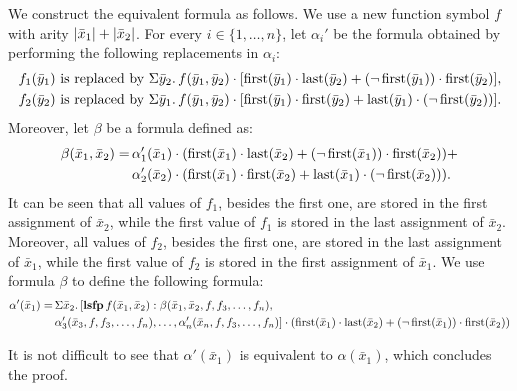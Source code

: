 We construct the equivalent formula as follows. We use a new function symbol $f$ with arity $\vert \bar{x}_1 \vert + \vert \bar{x}_2 \vert$. For every $i \in \{1,\ldots,n\}$, let $\alpha_i'$ be the formula obtained by performing the following replacements in $\alpha_i$:
\begin{align*}
f_1(\bar{y}_1) &\text{ is replaced by } \Sigma{\bar{y}_2}.\,f(\bar{y}_1,\bar{y}_2)\cdot[\operatorname{first}(\bar{y}_1)\cdot\operatorname{last}(\bar{y}_2)  + (\neg\operatorname{first}(\bar{y}_1))\cdot\operatorname{first}(\bar{y}_2)], \\
f_2(\bar{y}_2) &\text{ is replaced by } \Sigma{\bar{y}_1}.\,f(\bar{y}_1,\bar{y}_2)\cdot[\operatorname{first}(\bar{y}_1)\cdot\operatorname{first}(\bar{y}_2)  + \operatorname{last}(\bar{y}_1)\cdot(\neg\operatorname{first}(\bar{y}_2))].
\end{align*}
Moreover, let $\beta$ be a formula defined as:
\begin{align*}
\beta(\bar{x}_1,\bar{x}_2) = \,&\alpha_1'(\bar{x}_1)\cdot(\operatorname{first}(\bar{x}_1)\cdot\operatorname{last}(\bar{x}_2)  + (\neg\operatorname{first}(\bar{x}_1))\cdot\operatorname{first}(\bar{x}_2)) + \\ &\alpha_2'(\bar{x}_2)\cdot(\operatorname{first}(\bar{x}_1)\cdot\operatorname{first}(\bar{x}_2)  + \operatorname{last}(\bar{x}_1)\cdot(\neg\operatorname{first}(\bar{x}_2))).
\end{align*}
It can be seen that all values of $f_1$, besides the first one, are stored in the first assignment of $\bar{x}_2$, while the first value of $f_1$ is stored in the last assignment of $\bar{x}_2$. Moreover, all values of $f_2$, besides the first one, are stored in the last assignment of $\bar{x}_1$, while the first value of $f_2$ is stored in the first assignment of $\bar{x}_1$. 
We use formula $\beta$ to define the following formula:
\begin{align*}
\alpha'(\bar{x}_1) = \,&\Sigma{\bar{x}_2}.\,[{\bf lsfp} \, f(\bar{x}_1,\bar{x}_2): \beta(\bar{x}_1,\bar{x}_2,f,f_3,\ldots,f_n),\\
&\alpha'_3(\bar{x}_3,f,f_3,\ldots,f_n),\ldots,\alpha'_n(\bar{x}_n,f,f_3,\ldots,f_n)]\cdot(\operatorname{first}(\bar{x}_1)\cdot\operatorname{last}(\bar{x}_2)  + (\neg\operatorname{first}(\bar{x}_1))\cdot\operatorname{first}(\bar{x}_2))
\end{align*}

It is not difficult to see that $\alpha'(\bar{x}_1)$ is equivalent to $\alpha(\bar{x}_1)$, which concludes the proof.

